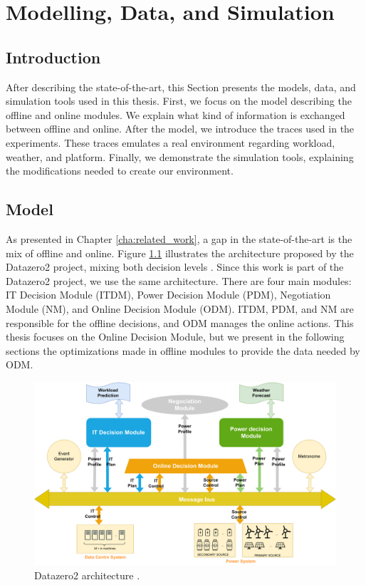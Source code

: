 \chapter{Modelling, Data, and Simulation}
\label{cha:model}

\minitoc

\section{Introduction}

After describing the state-of-the-art, this Section presents the models, data, and simulation tools used in this thesis. First, we focus on the model describing the offline and online modules. We explain what kind of information is exchanged between offline and online. After the model, we introduce the traces used in the experiments. These traces emulates a real environment regarding workload, weather, and platform. Finally, we demonstrate the simulation tools, explaining the modifications needed to create our environment.

\section{Model}

As presented in Chapter \ref{cha:related_work}, a gap in the state-of-the-art is the mix of offline and online. Figure \ref{fig:model} illustrates the architecture proposed by the Datazero2 project, mixing both decision levels \cite{Datazero}. Since this work is part of the Datazero2 project, we use the same architecture. There are four main modules: IT Decision Module (ITDM), Power Decision Module (PDM), Negotiation Module (NM), and Online Decision Module (ODM). ITDM, PDM, and NM are responsible for the offline decisions, and ODM manages the online actions. This thesis focuses on the Online Decision Module, but we present in the following sections the optimizations made in offline modules to provide the data needed by ODM. 

\begin{figure}[!htb]
    \centering
    \includegraphics[scale=0.45]{Images/Model/model.pdf}
    \caption{Datazero2 architecture \cite{Datazero}.}
    \label{fig:model}
\end{figure}

